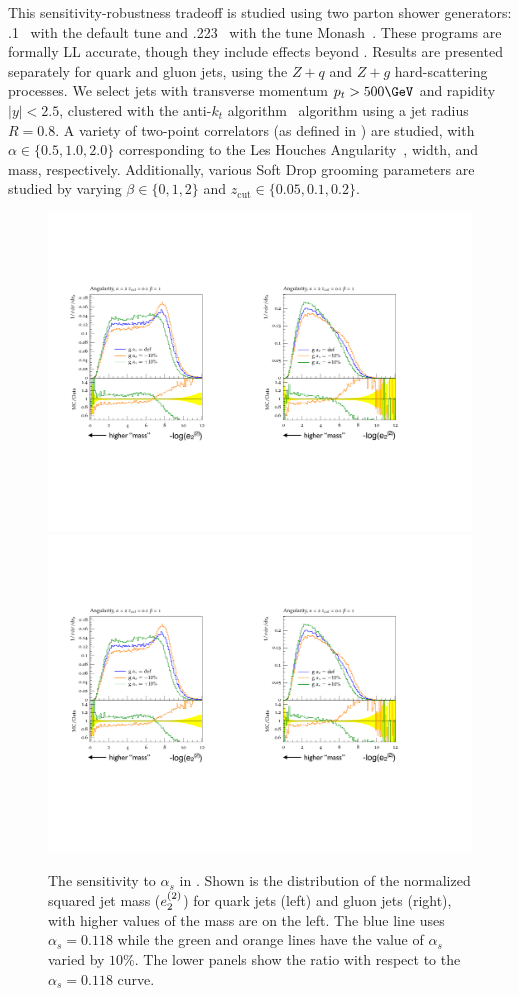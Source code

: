 This sensitivity-robustness tradeoff is studied using two parton shower generators: \herwig.1~\cite{Bellm:2015jjp,Reichelt:2017hts} with the default tune and \pythia.223~\cite{Sjostrand:2006za,Sjostrand:2014zea} with the tune Monash~\cite{Skands:2014pea}.  %
%
These programs are formally LL accurate, though they include effects beyond .
%
Results are presented separately for quark and gluon jets, using the $Z+q$ and $Z+g$ hard-scattering processes.
%
We select jets with transverse momentum $p_t>500\GeV$ and rapidity $|y|<2.5$, clustered with the anti-$k_t$ algorithm~\cite{Cacciari:2008gp} algorithm using a jet radius $R=0.8$.
%
A variety of two-point correlators (as defined in ) are studied, with $\alpha\in\{0.5,1.0, 2.0\}$ corresponding to the Les Houches Angularity~\cite{Gras:2017jty}, width, and mass, respectively. 
%
Additionally, various Soft Drop grooming parameters are studied by varying $\beta\in\{0,1,2\}$ and $z_\text{cut}\in \{0.05,0.1,0.2\}$.  

\begin{figure}[t]
\begin{center}
\includegraphics[width = 0.49\columnwidth]{figures/sensitivity2a.pdf}\includegraphics[width = 0.48\columnwidth]{figures/sensitivity2b.pdf}
\end{center}
\caption{The sensitivity to $\alpha_s$ in \herwig.  Shown is the distribution of the normalized squared jet mass ($e_{2}^{(2)}$) for quark jets (left) and gluon jets (right), with higher values of the mass are on the left.  The blue line uses $\alpha_s=0.118$ while the green and orange lines have the value of $\alpha_s$ varied by $10\%$.  The lower panels show the ratio with respect to the $\alpha_s=0.118$ curve.}
\label{fig:sensitivity}
\end{figure}

